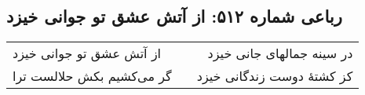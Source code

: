 \begin{center}
\section*{رباعی شماره ۵۱۲: از آتش عشق تو جوانی خیزد}
\label{sec:0512}
\begin{longtable}{l p{0.5cm} r}
از آتش عشق تو جوانی خیزد
&&
در سینه جمالهای جانی خیزد
\\
گر می‌کشیم بکش حلالست ترا
&&
کز کشتهٔ دوست زندگانی خیزد
\\
\end{longtable}
\end{center}
